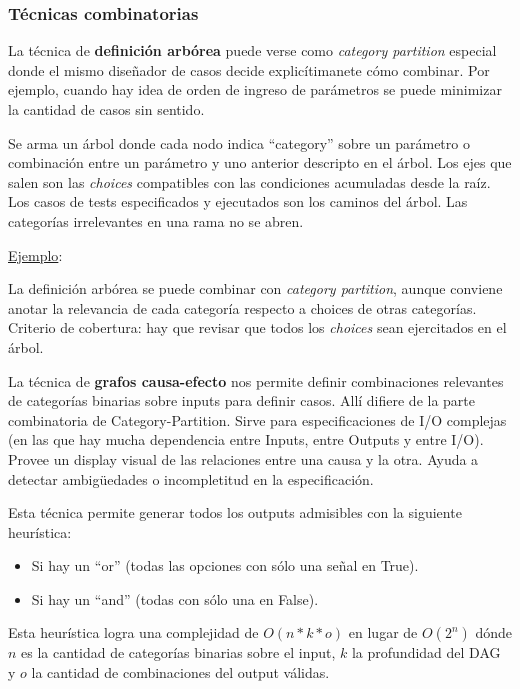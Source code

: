 \documentclass[]{article}
\begin{document}
\subsubsection{Técnicas combinatorias}
La técnica de \textbf{definición arbórea} puede verse como \textit{category partition} especial donde el mismo diseñador de casos decide explicítimanete cómo combinar. Por ejemplo, cuando hay idea de orden de ingreso de parámetros se puede minimizar la cantidad de casos sin sentido.

Se arma un árbol donde cada nodo indica ``category'' sobre un parámetro o combinación entre un parámetro y uno anterior descripto en el árbol. Los ejes que salen son las \textit{choices} compatibles con las condiciones acumuladas desde la raíz. Los casos de tests especificados y ejecutados son los caminos del árbol. Las categorías irrelevantes en una rama no se abren.

\underline{Ejemplo}:

La definición arbórea se puede combinar con \textit{category partition}, aunque conviene anotar la relevancia de cada categoría respecto a choices de otras categorías. Criterio de cobertura: hay que revisar que todos los \textit{choices} sean ejercitados en el árbol.

La técnica de \textbf{grafos causa-efecto} nos permite definir combinaciones relevantes de categorías binarias sobre inputs para definir casos. Allí difiere de la parte combinatoria de Category-Partition. Sirve para especificaciones de I/O complejas (en las que hay mucha dependencia entre Inputs, entre Outputs y entre I/O). Provee un display visual de las relaciones entre una causa y la otra. Ayuda a detectar ambigüedades o incompletitud en la especificación.

Esta técnica permite generar todos los outputs admisibles con la siguiente heurística:
\begin{itemize}
	\item Si hay un “or” (todas las opciones con sólo una señal en True).
	\item Si hay un “and” (todas con sólo una en False).
\end{itemize}

Esta heurística logra una complejidad de $O(n*k*o)$ en lugar de $O(2^n)$ dónde $n$ es la cantidad de categorías binarias sobre el input, $k$ la profundidad del DAG y $o$ la cantidad de combinaciones del output válidas.
\end{document}
